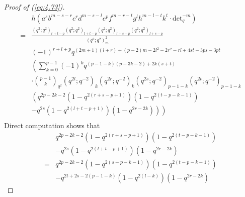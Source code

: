 \documentclass[10pt,a4paper]{amsart}
\begin{document}
\begin{proof}[Proof of (\ref{eq:4.73})]
    \begin{equation}\label{eq:4.78}
        \begin{split}
            &h\left(a^sb^{m-s-r}c^rd^{m-s-l}e^{p}f^{m-r-t}g^lh^{m-l-t}k^t\cdot\text{det}_q^{-m}\right)\\
            =&\frac{(q^2;q^2)_{r+t-p}(q^2;q^2)_{l+t-p}(q^2;q^2)_{r+s-p}(q^2;q^2)_{l+s-p}}{(q^2;q^2)_m^2}\\
            &(-1)^{r+l+p}q^{(2m+1)(l+r)+(p-2)m-2l^2-2r^2-rl+4st-3ps-3pt}\\
            &\left(\sum_{k=0}^{p-1}(-1)^{k}q^{(p-1-k)(p-3k-2)+2k(s+t)}\right.\\
            &\cdot{p-1\choose k}_{q^{2}}(q^{2l};q^{-2})_k(q^{2r};q^{-2})_k(q^{2s};q^{-2})_{p-1-k}(q^{2t};q^{-2})_{p-1-k}\\
            &\left(q^{2p-2k-2}(1-q^{2(r+s-p+1)})(1-q^{2(t-p-k-1)})\right.\\
            &\left.\left.-q^{2s}(1-q^{2(l+t-p+1)})(1-q^{2r-2k})\right)\right)\\
        \end{split}
    \end{equation}
    Direct computation shows that
    \begin{equation}\label{eq:4.79}
        \begin{split}
            &q^{2p-2k-2}(1-q^{2(r+s-p+1)})(1-q^{2(t-p-k-1)})\\
            &-q^{2s}(1-q^{2(l+t-p+1)})(1-q^{2r-2k})\\
            =&q^{2p-2k-2}(1-q^{2(s-p-k-1)})(1-q^{2(t-p-k-1)})\\
            &-q^{2t+2s-2(p-1-k)}(1-q^{2(l-k)})(1-q^{2r-2k})
        \end{split}
    \end{equation}

\end{proof}
\end{document}
